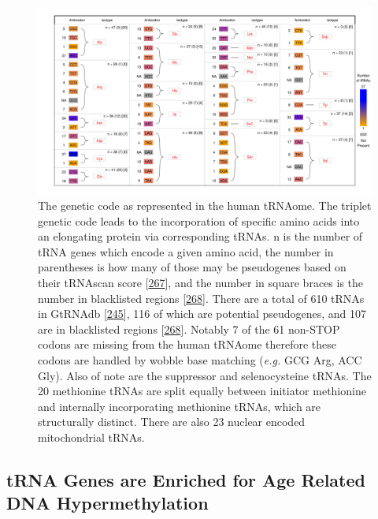 \documentclass[
]{book}
\begin{document}
\begin{figure}

{\centering \includegraphics[width=1\linewidth]{figs/kutteresq_BLcount} 

}

\caption{The genetic code as represented in the human tRNAome. The triplet genetic code leads to the incorporation of specific amino acids into an elongating protein via corresponding tRNAs. n is the number of tRNA genes which encode a given amino acid, the number in parentheses is how many of those may be pseudogenes based on their tRNAscan score {[}\protect\hyperlink{ref-Lowe2016}{267}{]}, and the number in square braces is the number in blacklisted regions {[}\protect\hyperlink{ref-Amemiya2019}{268}{]}. There are a total of 610 tRNAs in GtRNAdb {[}\protect\hyperlink{ref-Chan2009}{245}{]}, 116 of which are potential pseudogenes, and 107 are in blacklisted regions {[}\protect\hyperlink{ref-Amemiya2019}{268}{]}. Notably 7 of the 61 non-STOP codons are missing from the human tRNAome therefore these codons are handled by wobble base matching (\emph{e.g.} GCG Arg, ACC Gly). Also of note are the suppressor and selenocysteine tRNAs. The 20 methionine tRNAs are split equally between initiator methionine and internally incorporating methionine tRNAs, which are structurally distinct. There are also 23 nuclear encoded mitochondrial tRNAs.}\label{fig:kutteresq}
\end{figure}



\hypertarget{trna-genes-are-enriched-for-age-related-dna-hypermethylation}{%
\subsection{tRNA Genes are Enriched for Age Related DNA Hypermethylation}\label{trna-genes-are-enriched-for-age-related-dna-hypermethylation}}
\end{document}

